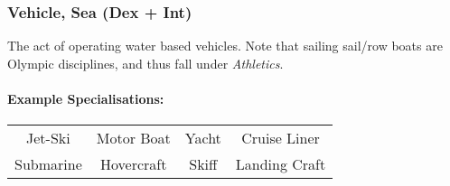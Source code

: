\subsubsection{Vehicle, Sea (Dex + Int)}
The act of operating water based vehicles.
Note that sailing sail/row boats are Olympic disciplines, and thus fall under \textit{Athletics}.

\paragraph{Example Specialisations:}
\begin{center}
    \begin{tabular}{c|c|c|c}
        Jet-Ski & Motor Boat & Yacht & Cruise Liner \\
        Submarine & Hovercraft & Skiff & Landing Craft \\
    \end{tabular}
\end{center}